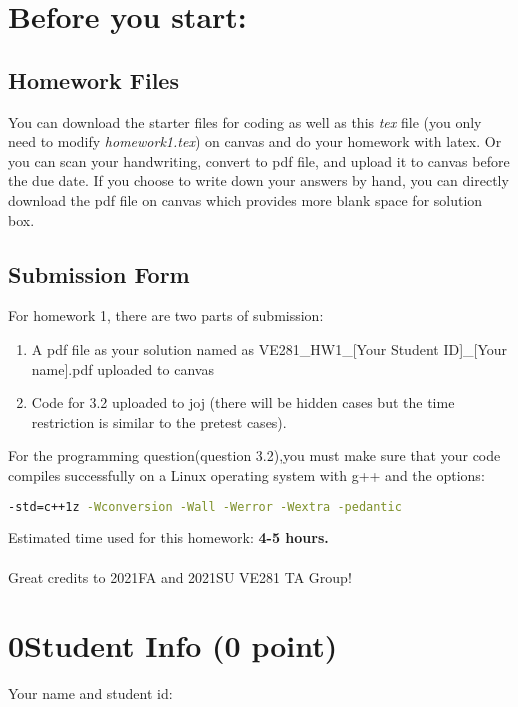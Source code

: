 \documentclass[11pt]{exam}
\begin{document}
\setlength{\parindent}{0pt}
\section*{Before you start:}

\subsection*{Homework Files}
You can download the starter files for coding as well as this \textit{tex} file (you only need to modify \textit{homework1.tex}) on canvas and do your homework with latex. Or you can scan your handwriting, convert to pdf file, and upload it to canvas before the due date. If you choose to write down your answers by hand, you can directly download the pdf file on canvas which provides more blank space for solution box.\\

\subsection*{Submission Form}
For homework 1, there are two parts of submission:
\begin{enumerate}
    \item A pdf file as your solution named as VE281\_HW1\_[Your Student ID]\_[Your name].pdf uploaded to canvas
    \item Code for 3.2 uploaded to joj (there will be hidden cases but the time restriction is similar to the pretest cases).
\end{enumerate}
For the programming question(question 3.2),you must make sure that your code compiles successfully on a Linux operating system with g++ and the options:
\begin{lstlisting}[language=bash]
-std=c++1z -Wconversion -Wall -Werror -Wextra -pedantic
\end{lstlisting}

Estimated time used for this homework: \textbf{4-5 hours.}
\\\\
Great credits to 2021FA and 2021SU VE281 TA Group!

\newpage
\section*{0\quad Student Info (0 point)}
Your name and student id:
\begin{solution}
\end{solution}
\end{document}

